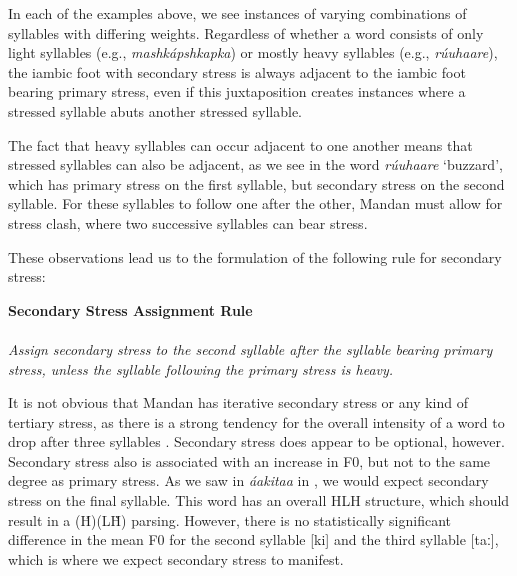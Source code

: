 In each of the examples above, we see instances of varying combinations of syllables with differing weights. Regardless of whether a word consists of only light syllables (e.g., \textit{mashkápshkapka}) or mostly heavy syllables (e.g., \textit{rúuhaare}), the iambic foot with secondary stress is always adjacent to the iambic foot bearing primary stress, even if this juxtaposition creates instances where a stressed syllable abuts another stressed syllable.

\largerpage
The fact that heavy syllables can occur adjacent to one another means that stressed syllables can also be adjacent, as we see in the word \textit{rúuhaare} `buzzard', which has primary stress on the first syllable, but secondary stress on the second syllable. For these syllables to follow one after the other, Mandan must allow for stress clash, where two successive syllables can bear stress.

These observations lead us to the formulation of the following rule for secondary stress:

\begin{exe}

\item\label{SecondaryStressSPERule} \textbf{Secondary Stress Assignment Rule}\\
	\\
	\textit{Assign secondary stress to the second syllable after the syllable bearing primary stress, unless the syllable following the primary stress is heavy.}

\end{exe}

It is not obvious that Mandan has iterative secondary stress or any kind of tertiary stress, as there is a strong tendency for the overall intensity of a word to drop after three syllables \citep{kasak2022}. Secondary stress does appear to be optional, however. Secondary stress also is associated with an increase in F0, but not to the same degree as primary stress. As we saw in \textit{áakitaa} in , we would expect secondary stress on the final syllable. This word has an overall HLH structure, which should result in a (H́)(LH̀) parsing. However, there is no statistically significant difference in the mean F0 for the second syllable [ki] and the third syllable [taː], which is where we expect secondary stress to manifest.


